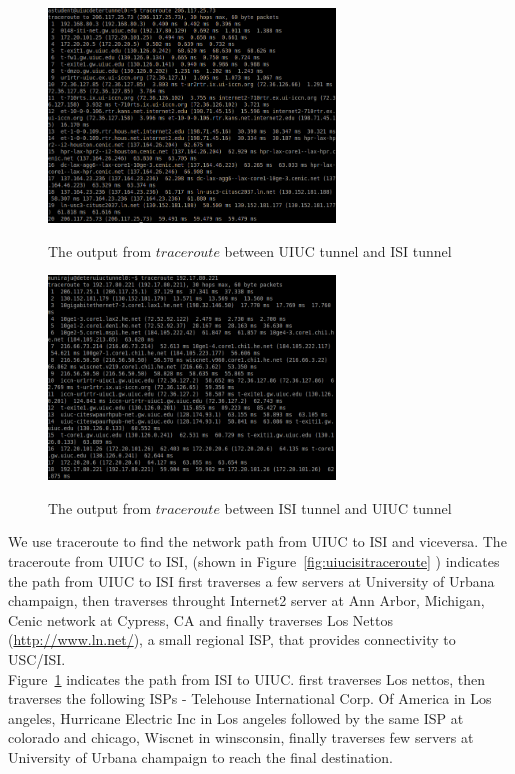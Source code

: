\documentclass{sig-alternate-10pt} \usepackage{enumerate}
\begin{document}
\begin{figure} 
  \begin{center}
    \includegraphics[width=3in]{traceroute_uiuctunnel2detertunnel.png}
    \caption{The output from $traceroute$ between UIUC tunnel and ISI tunnel }
    \label{fig:uiucisitraceroute} 
    \includegraphics[width=3in]{traceroute_detertunnel2uiuctunnel.png}
    \caption{The output from $traceroute$ between ISI tunnel and UIUC tunnel }
    \label{fig:isiuiuctraceroute} 
  \end{center} 
\end{figure}


We use traceroute to find the network path from UIUC to ISI and viceversa. 
The traceroute from UIUC to ISI, (shown in
 Figure~\ref{fig:uiucisitraceroute} ) indicates the path from UIUC to ISI first 
 traverses a few servers at University of Urbana champaign, then traverses
 throught Internet2 server at Ann Arbor, Michigan, Cenic network at Cypress, CA and finally traverses
 Los Nettos (\url{http://www.ln.net/}), a small regional ISP, that
provides connectivity to USC/ISI.
\\Figure~\ref{fig:isiuiuctraceroute} indicates the path from ISI to UIUC. first 
 traverses Los nettos, then traverses the following ISPs - Telehouse International Corp. Of America in Los angeles, Hurricane Electric Inc in Los angeles followed by the same ISP at colorado and chicago, Wiscnet in winsconsin, finally traverses few servers at  University of Urbana champaign to reach the final destination.
\end{document}
